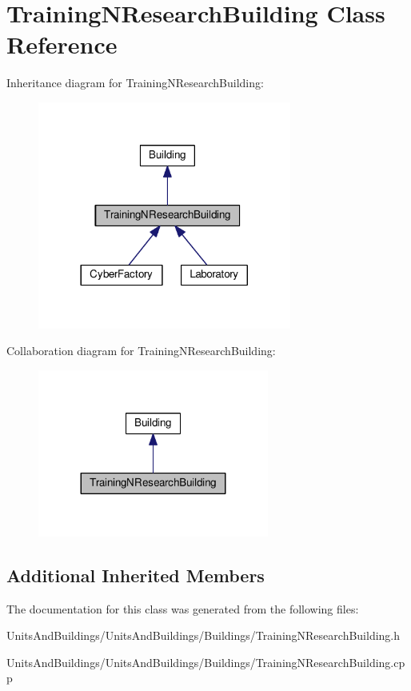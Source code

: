 \hypertarget{class_training_n_research_building}{}\section{Training\+N\+Research\+Building Class Reference}
\label{class_training_n_research_building}


Inheritance diagram for Training\+N\+Research\+Building\+:
\nopagebreak
\begin{figure}[H]
\begin{center}
\leavevmode
\includegraphics[width=236pt]{class_training_n_research_building__inherit__graph}
\end{center}
\end{figure}


Collaboration diagram for Training\+N\+Research\+Building\+:
\nopagebreak
\begin{figure}[H]
\begin{center}
\leavevmode
\includegraphics[width=215pt]{class_training_n_research_building__coll__graph}
\end{center}
\end{figure}
\subsection*{Additional Inherited Members}


The documentation for this class was generated from the following files\+:\begin{DoxyCompactItemize}
\item 
Units\+And\+Buildings/\+Units\+And\+Buildings/\+Buildings/Training\+N\+Research\+Building.\+h\item 
Units\+And\+Buildings/\+Units\+And\+Buildings/\+Buildings/Training\+N\+Research\+Building.\+cpp\end{DoxyCompactItemize}
